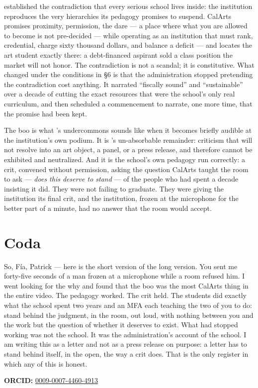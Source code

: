 \documentclass[10pt,letterpaper,twocolumn]{article}
\begin{document}
\citet{bourdieu1977reproduction} established the contradiction that every
serious school lives inside: the institution reproduces the very hierarchies
its pedagogy promises to suspend. CalArts promises proximity, permission, the
dare --- a place where what you are allowed to become is not pre-decided ---
while operating as an institution that must rank, credential, charge sixty
thousand dollars, and balance a deficit --- and \citet{davis2013theses}
locates the art student exactly there: a debt-financed aspirant sold a class
position the market will not honor. The contradiction is not a scandal; it is
constitutive. What changed under the conditions in \S6 is that the
administration stopped pretending the contradiction cost anything. It
narrated ``fiscally sound'' and ``sustainable'' over a decade of cutting the
exact resources that were the school's only real curriculum, and then
scheduled a commencement to narrate, one more time, that the promise had been
kept.

The boo is what \citet{harney2013undercommons}'s undercommons sounds like
when it becomes briefly audible at the institution's own podium. It is
\citet{fraser2005critique}'s un-absorbable remainder: criticism that will not
resolve into an art object, a panel, or a press release, and therefore cannot
be exhibited and neutralized. And it is the school's own pedagogy run
correctly: a crit, convened without permission, asking the question CalArts
taught the room to ask --- \emph{does this deserve to stand} --- of the
people who had spent a decade insisting it did. They were not failing to
graduate. They were giving the institution its final crit, and the
institution, frozen at the microphone for the better part of a minute, had no
answer that the room would accept.

\section{Coda}

So, Fía, Patrick --- here is the short version of the long version. You sent
me forty-five seconds of a man frozen at a microphone while a room refused
him. I went looking for the why and found that the boo was the most CalArts
thing in the entire video. The pedagogy worked. The crit held. The students
did exactly what the school spent two years and an MFA each teaching the two
of you to do: stand behind the judgment, in the room, out loud, with nothing
between you and the work but the question of whether it deserves to exist.
What had stopped working was not the school. It was the administration's
account of the school. I am writing this as a letter and not as a press
release on purpose: a letter has to stand behind itself, in the open, the way
a crit does. That is the only register in which any of this is honest.

\vspace{0.5em}
\noindent\textbf{ORCID:} \href{https://orcid.org/0009-0007-4460-4913}{0009-0007-4460-4913}



\end{document}
